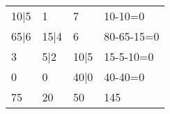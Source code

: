 \begin{itemize}
    \begin{tabular}{llll}
\cline{1-3}
\multicolumn{1}{|l|}{10|5} & \multicolumn{1}{l|}{1} & \multicolumn{1}{l|}{7}    & 10-10=0 \\ \cline{1-3}
\multicolumn{1}{|l|}{65|6} & \multicolumn{1}{l|}{15|4} & \multicolumn{1}{l|}{6}    & 80-65-15=0 \\ \cline{1-3}
\multicolumn{1}{|l|}{3}    & \multicolumn{1}{l|}{5|2}  & \multicolumn{1}{l|}{10|5} & 15-5-10=0  \\ \cline{1-3}
\multicolumn{1}{|l|}{0}    & \multicolumn{1}{l|}{0} & \multicolumn{1}{l|}{40|0} & 40-40=0 \\ \cline{1-3}
75  & 20                     & 50                        & 145    
\end{tabular}








\end{itemize}